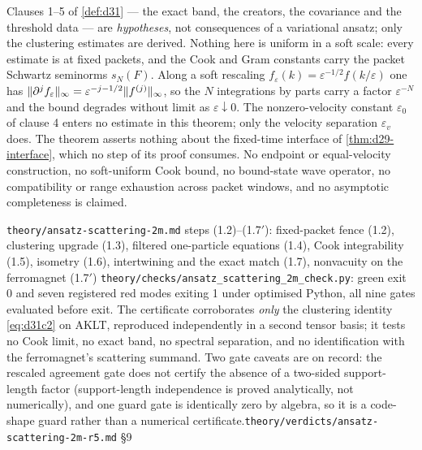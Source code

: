 \begin{scope}
Clauses 1--5 of \cref{def:d31} --- the exact band, the creators, the
covariance and the threshold data --- are \emph{hypotheses}, not consequences
of a variational ansatz; only the clustering estimates are derived. Nothing
here is uniform in a soft scale: every estimate is at fixed packets, and the
Cook and Gram constants carry the packet Schwartz seminorms $s_N(F)$. Along a
soft rescaling $f_\varepsilon(k)=\varepsilon^{-1/2}f(k/\varepsilon)$ one has
$\lVert \partial^jf_\varepsilon\rVert_\infty=\varepsilon^{-j-1/2}\lVert f^{(j)}\rVert_\infty$,
so the $N$ integrations by parts carry a factor $\varepsilon^{-N}$ and the
bound degrades without limit as $\varepsilon\downarrow0$. The nonzero-velocity
constant $\varepsilon_0$ of clause 4 enters no estimate in this theorem; only
the velocity separation $\varepsilon_v$ does. The theorem asserts nothing
about the fixed-time interface of \cref{thm:d29-interface}, which no step of
its proof consumes. No endpoint or equal-velocity construction, no
soft-uniform Cook bound, no bound-state wave operator, no compatibility or
range exhaustion across packet windows, and no asymptotic completeness is
claimed.
\end{scope}
%
{\texttt{theory/ansatz-scattering-2m.md} steps (1.2)--(1.7$'$): fixed-packet
fence (1.2), clustering upgrade (1.3), filtered one-particle equations (1.4),
Cook integrability (1.5), isometry (1.6), intertwining and the exact match
(1.7), nonvacuity on the ferromagnet (1.7$'$)}%
{\texttt{theory/checks/ansatz\_scattering\_2m\_check.py}: green exit 0 and
seven registered red modes exiting 1 under optimised Python, all nine gates
evaluated before exit. The certificate corroborates \emph{only} the clustering
identity \cref{eq:d31c2} on AKLT, reproduced independently in a second tensor
basis; it tests no Cook limit, no exact band, no spectral separation, and no
identification with the ferromagnet's scattering summand. Two gate caveats are
on record: the rescaled agreement gate does not certify the absence of a
two-sided support-length factor (support-length independence is proved
analytically, not numerically), and one guard gate is identically zero by
algebra, so it is a code-shape guard rather than a numerical
certificate.}{\texttt{theory/verdicts/ansatz-scattering-2m-r5.md} §9}

